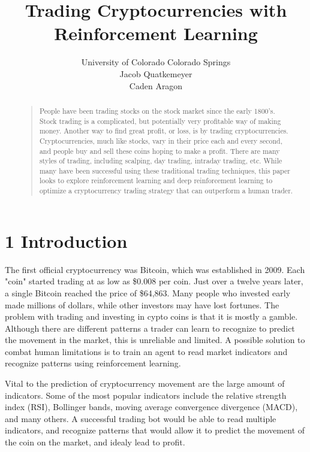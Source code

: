 \documentclass[letterpaper]{article}
\begin{document}
%
\title{Trading Cryptocurrencies with\\Reinforcement Learning}
\author{University of Colorado Colorado Springs\\Jacob Quatkemeyer\\Caden Aragon
}
\maketitle
\begin{abstract}
\begin{quote}
People have been trading stocks on the stock market since the early 1800's. Stock trading is a complicated, but potentially very profitable way of making money. Another way to find great
profit, or loss, is by trading cryptocurrencies. Cryptocurrencies, much like stocks, vary in their price each and every second, and people buy and sell these coins hoping to make a profit. There are many styles of trading, including scalping, day trading, intraday trading, etc. While many have been successful using these traditional trading techniques, this paper looks to explore reinforcement learning and deep reinforcement learning to optimize a cryptocurrency trading strategy that can outperform a human trader.
\end{quote}
\end{abstract}

\section{1 Introduction}
\noindent The first official cryptocurrency was Bitcoin, which was established in 2009. Each "coin" started trading at as low as \$0.008 per coin. Just over a twelve years later, a single Bitcoin reached the price of \$64,863. Many people who invested early made millions of dollars, while other investors may have lost fortunes. The problem with trading and investing in cypto coins is that it is mostly a gamble. Although there are different patterns a trader can learn to recognize to predict the movement in the market, this is unreliable and limited. A possible solution to combat human limitations is to train an agent to read market indicators and recognize patterns using reinforcement learning.

Vital to the prediction of cryptocurrency movement are the large amount of indicators. Some of the most popular indicators include the relative strength index (RSI), Bollinger bands, moving average convergence divergence (MACD), and many others. A successful trading bot would be able to read multiple indicators, and recognize patterns that would allow it to predict the movement of the coin on the market, and idealy lead to profit. 
\end{document}
